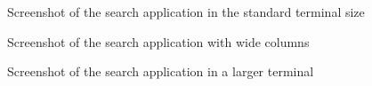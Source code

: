 \newpage
\begin{figure}
\caption{Screenshot of the search application in the standard terminal size}
\label{xterm-resh-normal-80}
\end{figure}

\begin{figure}
\caption{Screenshot of the search application with wide columns}
\label{xterm-resh-normal-80-long}
\end{figure}

\newpage
\begin{figure}
\centering
{}
\caption{Screenshot of the search application in a larger terminal}
\label{xterm-resh-normal-full}
\end{figure}


